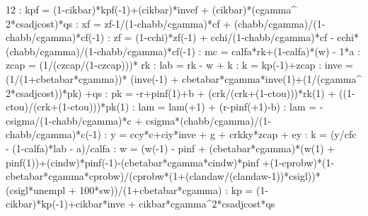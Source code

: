 \documentclass{article}%
\begin{document}
 12   :  kpf = (1{-}cikbar)*kpf({-}1)+(cikbar)*invef + (cikbar)*(cgamma\^{} 2*csadjcost)*qs\newline%
   :  xf = zf{-}1/(1{-}chabb/cgamma)*cf + (chabb/cgamma)/(1{-}chabb/cgamma)*cf({-}1)\newline%
   :  zf = (1{-}cchi)*zf({-}1) + cchi/(1{-}chabb/cgamma)*cf {-} cchi*(chabb/cgamma)/(1{-}chabb/cgamma)*cf({-}1)\newline%
   :  mc =  calfa*rk+(1{-}calfa)*(w) {-} 1*a\newline%
   :  zcap =  (1/(czcap/(1{-}czcap)))* rk\newline%
   :  lab = rk {-} w + k\newline%
   :  k =  kp({-}1)+zcap\newline%
   :  inve = (1/(1+cbetabar*cgamma))* (inve({-}1) + cbetabar*cgamma*inve(1)+(1/(cgamma\^{} 2*csadjcost))*pk) +qs\newline%
   :  pk = {-}r+pinf(1)+b + (crk/(crk+(1{-}ctou)))*rk(1) +  ((1{-}ctou)/(crk+(1{-}ctou)))*pk(1)\newline%
   :  lam = lam(+1) + (r{-}pinf(+1){-}b)\newline%
   :  lam = {-}csigma/(1{-}chabb/cgamma)*c + csigma*(chabb/cgamma)/(1{-}chabb/cgamma)*c({-}1)\newline%
   :  y = ccy*c+ciy*inve + g + crkky*zcap  + ey\newline%
   :  k = (y/cfc {-} (1{-}calfa)*lab {-} a)/calfa\newline%
   :  w = (w({-}1) {-} pinf + (cbetabar*cgamma)*(w(1) + pinf(1))+(cindw)*pinf({-}1){-}(cbetabar*cgamma*cindw)*pinf +(1{-}cprobw)*(1{-}cbetabar*cgamma*cprobw)/(cprobw*(1+(clandaw/(clandaw{-}1))*csigl))*(csigl*unempl + 100*sw))/(1+cbetabar*cgamma)\newline%
   :  kp =  (1{-}cikbar)*kp({-}1)+cikbar*inve + cikbar*cgamma\^{}2*csadjcost*qs\newline%
\end{document}
